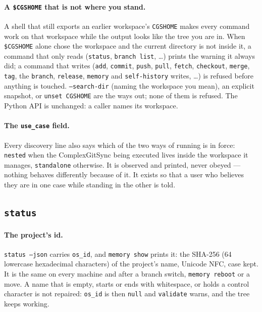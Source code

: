 \paragraph{A \texttt{\$CGSHOME} that is not where you stand.} A shell that
still exports an earlier workspace's \texttt{CGSHOME} makes every command
work on that workspace while the output looks like the tree you are in.
When \texttt{\$CGSHOME} alone chose the workspace and the current directory
is not inside it, a command that only reads (\texttt{status},
\texttt{branch list}, \ldots) prints the warning it always did; a command
that writes (\texttt{add}, \texttt{commit}, \texttt{push},
\texttt{pull}, \texttt{fetch}, \texttt{checkout}, \texttt{merge},
\texttt{tag}, the \texttt{branch}, \texttt{release}, \texttt{memory} and
\texttt{self-history} writes, \ldots) is refused before anything is
touched. \texttt{--search-dir} (naming the workspace you mean), an explicit
snapshot, or \texttt{unset CGSHOME} are the ways out; none of them is
refused. The Python API is unchanged: a caller names its workspace.

\paragraph{The \texttt{use\_case} field.} Every discovery line also says
which of the two ways of running is in force: \texttt{nested} when the
ComplexGitSync being executed lives inside the workspace it manages,
\texttt{standalone} otherwise. It is observed and printed, never obeyed ---
nothing behaves differently because of it. It exists so that a user who
believes they are in one case while standing in the other is told.

\subsection{\texttt{status}}

\paragraph{The project's id.}
\texttt{status --json} carries \texttt{os\_id}, and \texttt{memory show}
prints it: the SHA-256 (64 lowercase hexadecimal characters) of the
project's name, Unicode NFC, case kept. It is the same on every machine and
after a branch switch, \texttt{memory reboot} or a move. A name that is empty,
starts or ends with whitespace, or holds a control character is not
repaired: \texttt{os\_id} is then \texttt{null} and \texttt{validate} warns,
and the tree keeps working.


